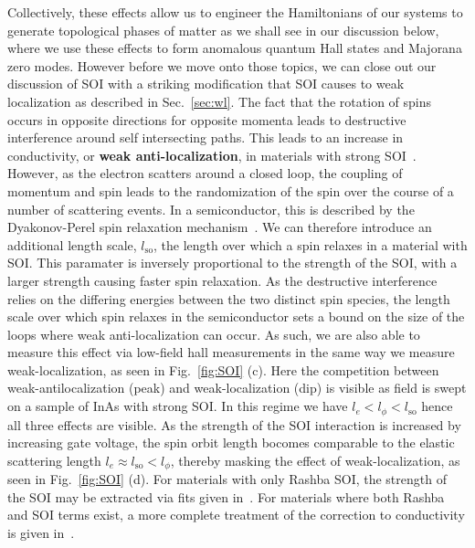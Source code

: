 Collectively, these effects allow us to engineer the Hamiltonians of our systems to generate topological phases of matter as we shall see in our discussion below,
where we use these effects to form anomalous quantum Hall states and Majorana zero modes. However before we move onto those topics, we can close out our discussion of SOI
with a striking modification that SOI causes to weak localization as described in Sec.~\ref{sec:wl}. The fact that the rotation of spins occurs in opposite
directions for opposite momenta leads to destructive interference around self intersecting paths. This leads to an increase in conductivity, or \textbf{weak anti-localization},
in materials with strong SOI~\cite{10.1143/PTP.63.707}. However, as the electron scatters around a closed loop, the coupling of momentum and spin leads to the randomization of
the spin over the course of a number of scattering events. In a semiconductor, this is described by the Dyakonov-Perel spin relaxation
mechanism~\cite{DYAKONOV1971459}. We can therefore introduce an additional length scale, $l_\textrm{so}$, the length over which a spin relaxes in a material with SOI.
This paramater is inversely proportional to the strength of the SOI, with a larger strength causing faster spin relaxation.
As the destructive interference relies on the differing energies between the two distinct spin species, the length scale over which spin relaxes in the semiconductor sets
a bound on the size of the loops where weak anti-localization can occur. As such, we are also able to measure
this effect via low-field hall measurements in the same way we measure weak-localization, as seen in Fig.~\ref{fig:SOI} (c). Here the competition between
weak-antilocalization (peak) and weak-localization (dip) is visible as field is swept on a sample of InAs with strong SOI. In this regime we have $l_e < l_\phi < l_\textrm{so}$
hence all three effects are visible. As the strength of the SOI interaction is increased by increasing gate voltage, the spin orbit length bocomes comparable to the elastic
scattering length $l_e \approx l_\textrm{so} < l_\phi$, thereby masking the effect of weak-localization, as seen in Fig.~\ref{fig:SOI} (d). For materials with only
Rashba SOI, the strength of the SOI may be extracted via fits given in~\cite{10.1143/PTP.63.707}. For materials where both Rashba and SOI terms exist, a more complete
treatment of the correction to conductivity is given in~\cite{PhysRevB.53.3912}.

